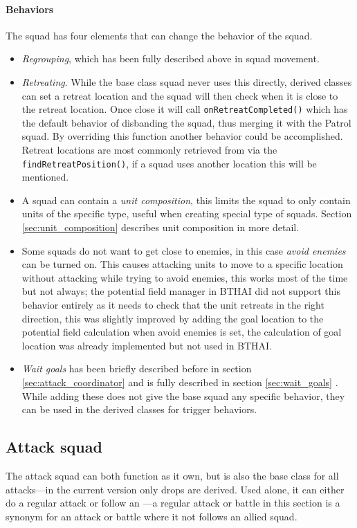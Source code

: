 \paragraph{Behaviors}
The squad has four elements that can change the behavior of the squad.
\begin{itemize}
	\item \emph{Regrouping}, which has been fully described above in squad movement.
	\item \emph{Retreating}. While the base class squad never uses this directly, derived classes can set a retreat location and the squad will then check when it is close to the retreat location. Once close it will call \texttt{onRetreatCompleted()} which has the default behavior of disbanding the squad, thus merging it with the Patrol squad. By overriding this function another behavior could be accomplished. Retreat locations are most commonly retrieved from  via the \texttt{findRetreatPosition()}, if a squad uses another location this will be mentioned.
	\item A squad can contain a \emph{unit composition}, this limits the squad to only contain units of the specific type, useful when creating special type of squads. Section \ref{sec:unit_composition} describes unit composition in more detail.
	\item Some squads do not want to get close to enemies, in this case \emph{avoid enemies} can be turned on. This causes attacking units to move to a specific location without attacking while trying to avoid enemies, this works most of the time but not always; the potential field manager in BTHAI did not support this behavior entirely as it needs to check that the unit retreats in the right direction, this was slightly improved by adding the goal location to the potential field calculation when avoid enemies is set, the calculation of goal location was already implemented but not used in BTHAI.
	\item \emph{Wait goals} has been briefly described before in section \ref{sec:attack_coordinator}  and is fully described in section \ref{sec:wait_goals} . While adding these does not give the base squad any specific behavior, they can be used in the derived classes for trigger behaviors.
\end{itemize}

\subsection{Attack squad}
\label{sec:attack_squad}
The attack squad can both function as it own, but is also the base class for all attacks—in the current version only drops are derived. Used alone, it can either do a regular attack or follow an —a regular attack or battle in this section is a synonym for an attack or battle where it not follows an allied squad.

